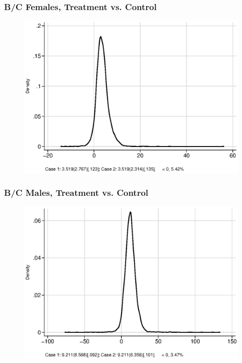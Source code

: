 \documentclass[static]{JJH-Beamer}
\begin{document}
\begin{frame}
\frametitle{B/C Females, Treatment vs. Control} 
\begin{figure}
	\includegraphics[width=.8\columnwidth]{output/ratios_2_sexf.eps}
\end{figure}
\end{frame}


\begin{frame}
\frametitle{B/C Males, Treatment vs. Control} 
\begin{figure}
	\includegraphics[width=.8\columnwidth]{output/ratios_2_sexm.eps}
\end{figure}
\end{frame}

\end{document}
